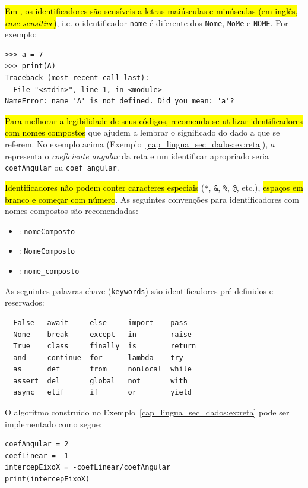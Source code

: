 \hl{Em {\python}, os identificadores são sensíveis a letras maiúsculas e minúsculas (em inglês, \textit{case sensitive})}, i.e. o identificador \texttt{nome} é diferente dos \texttt{Nome}, \texttt{NoMe} e \texttt{NOME}. Por exemplo:

\begin{lstlisting}
>>> a = 7
>>> print(A)
Traceback (most recent call last):
  File "<stdin>", line 1, in <module>
NameError: name 'A' is not defined. Did you mean: 'a'?
\end{lstlisting}

\hl{Para melhorar a legibilidade de seus códigos, recomenda-se utilizar identificadores com nomes compostos} que ajudem a lembrar o significado do dado a que se referem. No exemplo acima (Exemplo~\ref{cap_lingua_sec_dados:ex:reta}), $a$ representa o \emph{coeficiente angular} da reta e um identificar apropriado seria \texttt{coefAngular} ou \texttt{coef\_angular}.

\hl{Identificadores não podem conter caracteres especiais} (\lstinline+*+, \lstinline+&+, \lstinline+%+,
\lstinline+@+, etc.), \hl{espaços em branco e começar com número}. As seguintes convenções para identificadores com nomes compostos são recomendadas:
\begin{itemize}
\item {}: \texttt{nomeComposto}
\item {}: \texttt{NomeComposto}
\item {}: \texttt{nome\_composto}
\end{itemize}

\begin{obs}
  As seguintes palavras-chave (\texttt{keywords}) são identificadores pré-definidos e reservados:

\begin{verbatim}
  False   await     else     import    pass
  None    break     except   in        raise
  True    class     finally  is        return
  and     continue  for      lambda    try
  as      def       from     nonlocal  while
  assert  del       global   not       with
  async   elif      if       or        yield
\end{verbatim}

\end{obs}

\begin{ex}
  O algoritmo construído no Exemplo~\ref{cap_lingua_sec_dados:ex:reta} pode ser implementado como segue:

\begin{lstlisting}
coefAngular = 2
coefLinear = -1
intercepEixoX = -coefLinear/coefAngular
print(intercepEixoX)
\end{lstlisting}

\end{ex}

